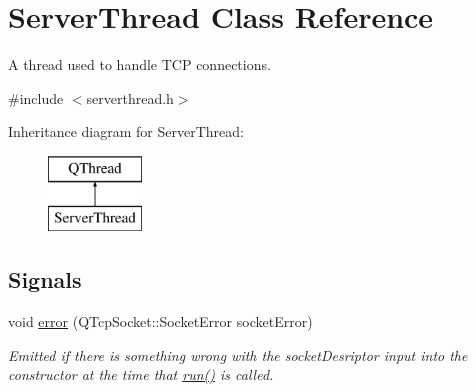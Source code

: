 \hypertarget{class_server_thread}{\section{Server\-Thread Class Reference}
\label{class_server_thread}
}


A thread used to handle T\-C\-P connections.  




{\ttfamily \#include $<$serverthread.\-h$>$}

Inheritance diagram for Server\-Thread\-:\begin{figure}[H]
\begin{center}
\leavevmode
\includegraphics[height=2.000000cm]{class_server_thread}
\end{center}
\end{figure}
\subsection*{Signals}
\begin{DoxyCompactItemize}
\item 
\hypertarget{class_server_thread_a86556e7c59fca134e91cd88d45699359}{void \hyperlink{class_server_thread_a86556e7c59fca134e91cd88d45699359}{error} (Q\-Tcp\-Socket\-::\-Socket\-Error socket\-Error)}\label{class_server_thread_a86556e7c59fca134e91cd88d45699359}

\begin{DoxyCompactList}\small\item\em Emitted if there is something wrong with the socket\-Desriptor input into the constructor at the time that \hyperlink{class_server_thread_add169bf62322681e6e124d0452579dee}{run()} is called. \end{DoxyCompactList}\end{DoxyCompactItemize}
